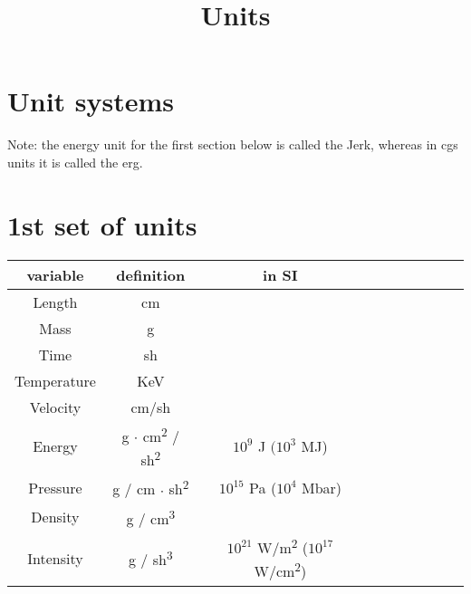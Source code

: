 \documentclass[11pt]{article}
\title{Units}
\begin{document}
\maketitle

\setlength{\cellspacetoplimit}{3pt}
\setlength{\cellspacebottomlimit}{3pt}

\section{Unit systems}
Note: the energy unit for the first section below is called the Jerk, whereas in cgs units it is called the erg.
\section{1st set of units}

\begin{center}
    \begin{tabular}{|Sc|Sc|Sc|Sc|Sc|}
        \hline
        variable & definition & in SI \\
        \hline 
        Length & cm & \\
        \hline
        Mass & g & \\
        \hline
        Time & sh & \\
        \hline
        Temperature & KeV & \\
        \hline
        Velocity & cm/sh & \\
        \hline
        Energy & g \( \cdot \) cm\textsuperscript{2} / sh\textsuperscript{2} & $10^9$ J  $(10^3$ MJ)\\
        \hline 
        Pressure & g / cm \( \cdot \) sh\textsuperscript{2} & $10^{15}$ Pa ($10^4$ Mbar) \\
        \hline
        Density & g / cm\textsuperscript{3} & \\
        \hline 
        Intensity & g / sh\textsuperscript{3} & $10^{21}$ W/m\textsuperscript{2} ($10^{17}$ W/cm\textsuperscript{2}) \\
        \hline
    \end{tabular}
\end{center}
\end{document}
